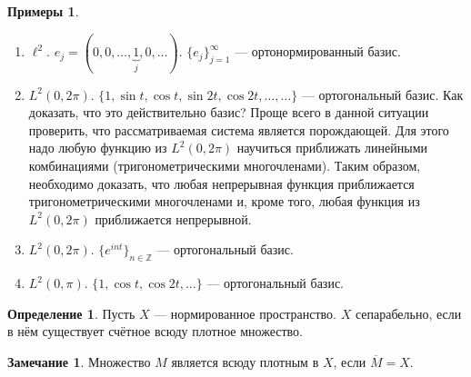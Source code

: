 \documentclass[11pt,openany,a4paper]{scrartcl}
\theoremstyle{plain}
\theoremstyle{definition}
\newtheorem{definition}[theorem]{Определение}
\newtheorem{remark}[theorem]{Замечание}
\newtheorem{examples}[theorem]{Примеры}
\newcommand\mb{\mathbb}
\newcommand\ol{\overline}
\begin{document}
\begin{examples}
\mbox{}
    \begin{enumerate}
        \item $\ell^2$. $e_j =
        (0, 0, \ldots, \underbrace{1}_j, 0, \ldots)$.
        $\{e_j\}_{j=1}^\infty$ — ортонормированный базис.
        \item $L^2(0, 2\pi)$.
        $\{1, \sin t, \cos t, \sin 2t, \cos 2t, \ldots, \ldots\}$ —
        ортогональный базис. Как доказать, 
        что это действительно базис? Проще всего в данной ситуации проверить, что
        рассматриваемая система является порождающей. Для этого надо любую функцию
        из $L^2(0, 2\pi)$ научиться приближать линейными комбинациями
        (тригонометрическими многочленами). Таким образом, необходимо доказать, 
        что любая непрерывная функция приближается тригонометрическими 
        многочленами и, кроме того, любая функция из $L^2(0, 2\pi)$ приближается
        непрерывной.
        \item $L^2(0, 2\pi)$. $\{e^{int}\}_{n \in \mb Z}$ — ортогональный базис.
        \item $L^2(0, \pi)$. $\{1,\cos t, \cos 2t, \ldots\}$ — ортогональный 
        базис.
    \end{enumerate}
\end{examples}

\begin{definition}
    Пусть $X$ — нормированное пространство. $X$ сепарабельно, если в нём 
    существует счётное всюду плотное множество.
\end{definition}
\begin{remark}
    Множество $M$ является всюду плотным в $X$, если $\ol M = X$.
\end{remark}
\end{document}
